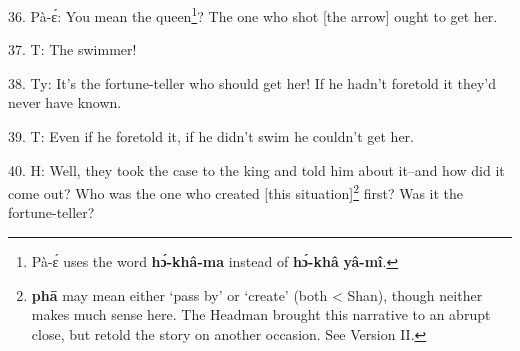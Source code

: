 36. Pà-ɛ́: You mean the queen\footnote{Pà-ɛ́ uses the word \textbf{hɔ́-khâ-ma} instead of \textbf{hɔ́-khâ} \textbf{yâ-mî}.}? The one who shot [the arrow] ought to get
her.

37. T: The swimmer!

38. Ty: It's the fortune-teller who should get her! If he hadn't foretold it they'd
never have known.

39. T: Even if he foretold it, if he didn't swim he couldn't get her.

40. H: Well, they took the case to the king and told him about it--and how did it
come out? Who was the one who created [this situation]\footnote{\textbf{phā} may mean either `pass by' or `create' (both < Shan), though neither makes much sense here. The Headman brought this narrative to an abrupt close, but retold the story on another occasion. See Version II.} first? Was it the fortune-teller?


